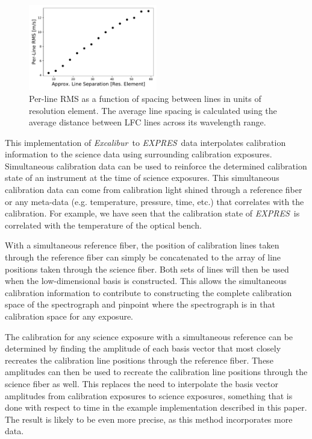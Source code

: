 \documentclass[modern]{aastex63}
\newcommand{\project}[1]{\textsl{#1}}
\newcommand{\name}{\project{Excalibur}}
\newcommand{\acronym}[1]{{\small{#1}}}
\newcommand{\expres}{\project{\acronym{EXPRES}}}
\begin{document}
\begin{figure}[h]
\centering
\includegraphics[width=0.5\textwidth]{Figures/lfcDensityTest.pdf}
\caption{Per-line RMS as a function of spacing between lines in units of resolution element.  The average line spacing is calculated using the average distance between LFC lines across its wavelength range.}
\label{fig:density}
\end{figure}

This implementation of \name\ to \expres\ data interpolates calibration information to the science data using surrounding calibration exposures.  Simultaneous calibration data can be used to reinforce the determined calibration state of an instrument at the time of science exposures.  This simultaneous calibration data can come from calibration light shined through a reference fiber or any meta-data (e.g. temperature, pressure, time, etc.) that correlates with the calibration.  For example, we have seen that the calibration state of \expres\ is correlated with the temperature of the optical bench.  

With a simultaneous reference fiber, the position of calibration lines taken through the reference fiber can simply be concatenated to the array of line positions taken through the science fiber.  Both sets of lines will then be used when the low-dimensional basis is constructed.  This allows the simultaneous calibration information to contribute to constructing the complete calibration space of the spectrograph and pinpoint where the spectrograph is in that calibration space for any exposure.

The calibration for any science exposure with a simultaneous reference can be determined by finding the amplitude of each basis vector that most closely recreates the calibration line positions through the reference fiber.  These amplitudes can then be used to recreate the calibration line positions through the science fiber as well.  This replaces the need to interpolate the basis vector amplitudes from calibration exposures to science exposures, something that is done with respect to time in the example implementation described in this paper.  The result is likely to be even more precise, as this method incorporates more data.
\end{document}
